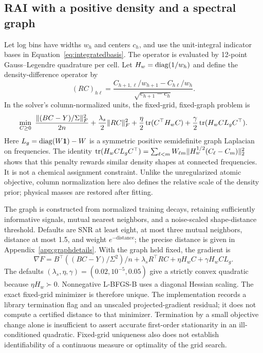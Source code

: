 \subsection{RAI with a positive density and a spectral graph}\label{sec:raidensity}
Let log bins have widths $w_h$ and centers $c_h$, and use the unit-integral indicator bases in Equation~\eqref{eq:integratedbasis}. The operator is evaluated by 12-point Gauss--Legendre quadrature per cell. Let $H_w=\operatorname{diag}(1/w_h)$ and define the density-difference operator by
\begin{equation}\label{eq:rairough}
 (RC)_{h\ell}=\frac{C_{h+1,\ell}/w_{h+1}-C_{h\ell}/w_h}
 {\sqrt{c_{h+1}-c_h}}.
\end{equation}
In the solver's column-normalized units, the fixed-grid, fixed-graph problem is
\begin{equation}\label{eq:raidensity}
 \min_{C\geq0}\ \frac{\|(BC-Y)/\Sigma\|_F^2}{2n}
 +\frac{\lambda_s}{2}\|RC\|_F^2
 +\frac{\eta}{2}\operatorname{tr}(C^\top H_wC)
 +\frac{\gamma}{2}\operatorname{tr}(H_w C L_g C^\top).
\end{equation}
Here $L_g=\operatorname{diag}(W\mathbf{1})-W$ is a symmetric positive semidefinite graph Laplacian on frequencies. The identity $\operatorname{tr}(H_w C L_g C^\top)=\sum_{\ell<m}W_{\ell m}\|H_w^{1/2}(C_\ell-C_m)\|_2^2$ shows that this penalty rewards similar density shapes at connected frequencies. It is not a chemical assignment constraint. Unlike the unregularized atomic objective, column normalization here also defines the relative scale of the density prior; physical masses are restored after fitting.

The graph is constructed from normalized training decays, retaining sufficiently informative signals, mutual nearest neighbors, and a noise-scaled shape-distance threshold. Defaults are SNR at least eight, at most three mutual neighbors, distance at most 1.5, and weight $e^{-\mathrm{distance}}$; the precise distance is given in Appendix~\ref{app:graphdetails}. With the graph held fixed, the gradient is
\begin{equation}\label{eq:raidensitygrad}
 \nabla F=B^\top((BC-Y)/\Sigma^2)/n
       +\lambda_sR^\top RC+\eta H_wC+\gamma H_w C L_g.
\end{equation}
The defaults $(\lambda_s,\eta,\gamma)=(0.02,10^{-5},0.05)$ give a strictly convex quadratic because $\eta H_w\succ0$. Nonnegative L-BFGS-B uses a diagonal Hessian scaling. The exact fixed-grid minimizer is therefore unique. The implementation records a library termination flag and an unscaled projected-gradient residual; it does not compute a certified distance to that minimizer. Termination by a small objective change alone is insufficient to assert accurate first-order stationarity in an ill-conditioned quadratic. Fixed-grid uniqueness also does not establish identifiability of a continuous measure or optimality of the grid search.

